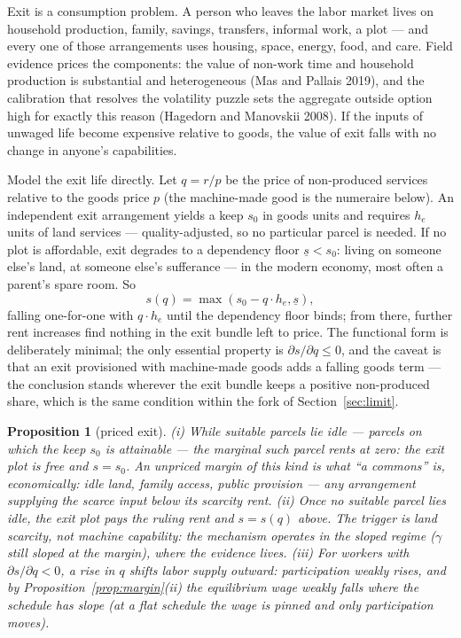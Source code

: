 \documentclass[12pt]{article}
\theoremstyle{plain}
\newtheorem{proposition}{Proposition}
\begin{document}
Exit is a consumption problem. A person who leaves the labor market lives on household production, family, savings, transfers, informal work, a plot --- and every one of those arrangements uses housing, space, energy, food, and care. Field evidence prices the components: the value of non-work time and household production is substantial and heterogeneous (Mas and Pallais 2019), and the calibration that resolves the volatility puzzle sets the aggregate outside option high for exactly this reason (Hagedorn and Manovskii 2008). If the inputs of unwaged life become expensive relative to goods, the value of exit falls with no change in anyone's capabilities.

Model the exit life directly. Let $q = r/p$ be the price of non-produced services relative to the goods price $p$ (the machine-made good is the numeraire below). An independent exit arrangement yields a keep $s_0$ in goods units and requires $h_e$ units of land services --- quality-adjusted, so no particular parcel is needed. If no plot is affordable, exit degrades to a dependency floor $\underline{s} < s_0$: living on someone else's land, at someone else's sufferance --- in the modern economy, most often a parent's spare room. So
\begin{equation}\label{eq:exit}
s(q) = \max( s_0 - q\cdot h_e , \underline{s} ),
\end{equation}
falling one-for-one with $q\cdot h_e$ until the dependency floor binds; from there, further rent increases find nothing in the exit bundle left to price. The functional form is deliberately minimal; the only essential property is $\partial s/\partial q \le 0$, and the caveat is that an exit provisioned with machine-made goods adds a falling goods term --- the conclusion stands wherever the exit bundle keeps a positive non-produced share, which is the same condition within the fork of Section~\ref{sec:limit}.

\begin{proposition}[priced exit]\label{prop:exit}
(i) While suitable parcels lie idle --- parcels on which the keep $s_0$ is attainable --- the marginal such parcel rents at zero: the exit plot is free and $s = s_0$. An unpriced margin of this kind is what ``a commons'' is, economically: idle land, family access, public provision --- any arrangement supplying the scarce input below its scarcity rent. (ii) Once no suitable parcel lies idle, the exit plot pays the ruling rent and $s = s(q)$ above. The trigger is land scarcity, not machine capability: the mechanism operates in the sloped regime ($\gamma$ still sloped at the margin), where the evidence lives. (iii) For workers with $\partial s/\partial q < 0$, a rise in $q$ shifts labor supply outward: participation weakly rises, and by Proposition~\ref{prop:margin}(ii) the equilibrium wage weakly falls where the schedule has slope (at a flat schedule the wage is pinned and only participation moves).
\end{proposition}
\end{document}
